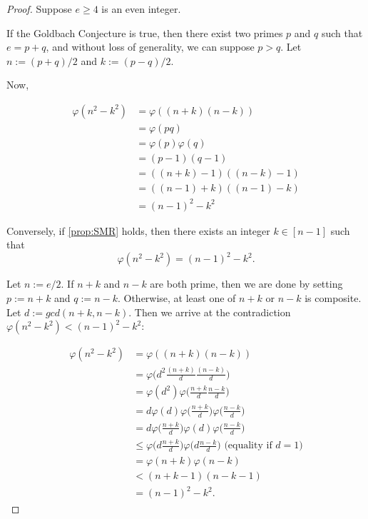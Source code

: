 \documentclass[12pt]{article}
\theoremstyle{definition}
\begin{document}
\begin{proof}
Suppose $e \geq 4$ is an even integer.

If the Goldbach Conjecture is true, then there exist two primes $p$ and $q$ such that $e = p + q$, and without loss of generality, we can suppose $p > q$. Let $n := (p + q)/2$ and $k := (p - q)/2$.

Now, 

\begin{align*}
  \varphi(n^2 - k^2) & = \varphi((n + k)(n - k)) \\
                     & = \varphi(pq) \\
                     & = \varphi(p)\varphi(q) \\
                     & = (p - 1)(q - 1) \\
                     & = ((n + k) - 1)((n - k) - 1) \\
                     & = ((n - 1) + k)((n - 1) - k) \\
                     & = (n - 1)^2 - k^2
\end{align*}

Conversely, if \ref{prop:SMR} holds, then there exists an integer $k \in [n-1]$ such that 
\[
\varphi(n^2 - k^2) = (n-1)^2 - k^2.
\]

Let $n := e/2$. If $n + k$ and $n - k$ are both prime, then we are done by setting $p := n + k$ and $q := n - k$. Otherwise, at least one of $n + k$ or $n - k$ is composite. Let $d := gcd(n + k, n - k)$. Then we arrive at the contradiction $\varphi(n^2 - k^2) < (n - 1)^2 - k^2$:

\begin{align*}
  \varphi(n^2 - k^2) & = \varphi((n + k)(n - k)) \\
                     & = \varphi\Big(d^2\frac{(n + k)}{d}\frac{(n - k)}{d}\Big) \\
                     & = \varphi(d^2)\varphi\Big(\frac{n + k}{d}\frac{n - k}{d}\Big) \\
                     & = d\varphi(d)\varphi\Big(\frac{n + k}{d}\Big)\varphi\Big(\frac{n - k}{d}\Big) \\
                     & = d\varphi\Big(\frac{n + k}{d}\Big)\varphi(d)\varphi\Big(\frac{n - k}{d}\Big) \\
                     & \leq \varphi\Big(d\frac{n + k}{d}\Big)\varphi\Big(d\frac{n - k}{d}\Big) \text{\ \ \ \ \ \ \ \ \ \ (equality if $d=1$)}\\
                     & = \varphi(n + k)\varphi(n - k) \\
                     & < (n + k - 1)(n - k - 1) \\
                     & = (n - 1)^2 - k^2.
\end{align*}
\end{proof}
\end{document}
